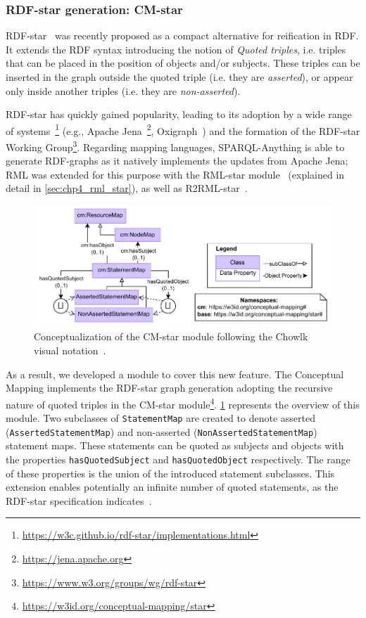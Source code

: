 \subsubsection{RDF-star generation: CM-star}
\label{sec:chp4_cm-star}
RDF-star~\parencite{hartig2017foundations} was recently proposed as a compact alternative for reification in RDF. It extends the RDF syntax introducing the notion of \textit{Quoted triples}, i.e. triples that can be placed in the position of objects and/or subjects. These triples can be inserted in the graph outside the quoted triple (i.e. they are \textit{asserted}), or appear only inside another triples (i.e. they are \textit{non-asserted}).

RDF-star has quickly gained popularity, leading
to its adoption by a wide range of systems~\footnote{\url{https://w3c.github.io/rdf-star/implementations.html}} (e.g., Apache Jena~\footnote{\url{https://jena.apache.org}}, Oxigraph~\parencite{oxigraph}) and the formation of the RDF-star Working Group\footnote{\url{https://www.w3.org/groups/wg/rdf-star}}. 
Regarding mapping languages, SPARQL-Anything is able to generate RDF-graphs as it natively implements the updates from Apache Jena; RML was extended for this purpose with the RML-star module~\parencite{iglesias2022rmlstar,delva2021rml-star,iglesias2023rml} (explained in detail in \cref{sec:chp4_rml_star}), as well as R2RML-star~\parencite{sundqvist2022extending}.

\begin{figure}[!t]
\centering
\includegraphics[width=0.9\linewidth]{figures/chp4-2_cm-star.pdf}
\caption[CM-star module]{Conceptualization of the CM-star module following the Chowlk visual notation~\parencite{feria2022chowlk}.}
\label{fig:chp4-2_cm-star}
\end{figure}




As a result, we developed a module to cover this new feature. The Conceptual Mapping implements the RDF-star graph generation adopting the recursive nature of quoted triples in the CM-star module\footnote{\url{https://w3id.org/conceptual-mapping/star}}. \cref{fig:chp4-2_cm-star} represents the overview of this module. Two subclasses of \texttt{StatementMap} are created to denote asserted (\texttt{AssertedStatementMap}) and non-asserted (\texttt{NonAssertedStatementMap}) statement maps. These statements can be quoted as subjects and objects with the properties \texttt{hasQuotedSubject} and \texttt{hasQuotedObject} respectively. The range of these properties is the union of the introduced statement subclasses. This extension enables potentially an infinite number of quoted statements, as the RDF-star specification indicates~\parencite{hartig2023rdf}. 



